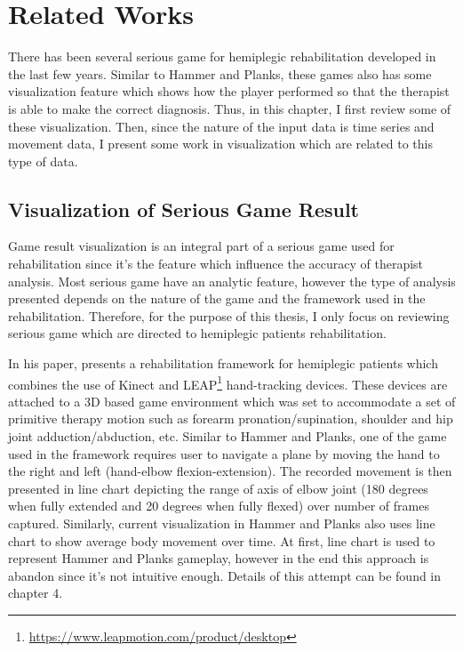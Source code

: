 \chapter{Related Works}
\label{chap:related}

There has been several serious game for hemiplegic rehabilitation developed in the last few years. Similar to Hammer and Planks, these games also has some visualization feature which shows how the player performed so that the therapist is able to make the correct diagnosis. Thus, in this chapter, I first review some of these visualization. Then, since the nature of the input data is time series and movement data, I present some work in visualization which are related to this type of data.

\section{Visualization of Serious Game Result} 

Game result visualization is an integral part of a serious game used for rehabilitation since it's the feature which influence the accuracy of therapist analysis. Most serious game have an analytic feature, however the type of analysis presented depends on the nature of the game and the framework used in the rehabilitation. Therefore, for the purpose of this thesis, I only focus on reviewing serious game which are directed to hemiplegic patients rehabilitation.

In his paper, \cite{rahman} presents a rehabilitation framework for hemiplegic patients which combines the use of Kinect and LEAP\footnote{\url{https://www.leapmotion.com/product/desktop}} hand-tracking devices. These devices are attached to a 3D based game environment which was set to accommodate a set of primitive therapy motion such as forearm pronation/supination, shoulder and hip joint adduction/abduction, etc. Similar to Hammer and Planks, one of the game used in the framework requires user to navigate a plane by moving the hand to the right and left (hand-elbow flexion-extension). The recorded movement is then presented in line chart depicting the range of axis of elbow joint (180 degrees when fully extended and 20 degrees when fully flexed) over number of frames captured. Similarly, current visualization in Hammer and Planks also uses line chart to show average body movement over time. At first, line chart is used to represent Hammer and Planks gameplay, however in the end this approach is abandon since it's not intuitive enough. Details of this attempt can be found in chapter 4.

